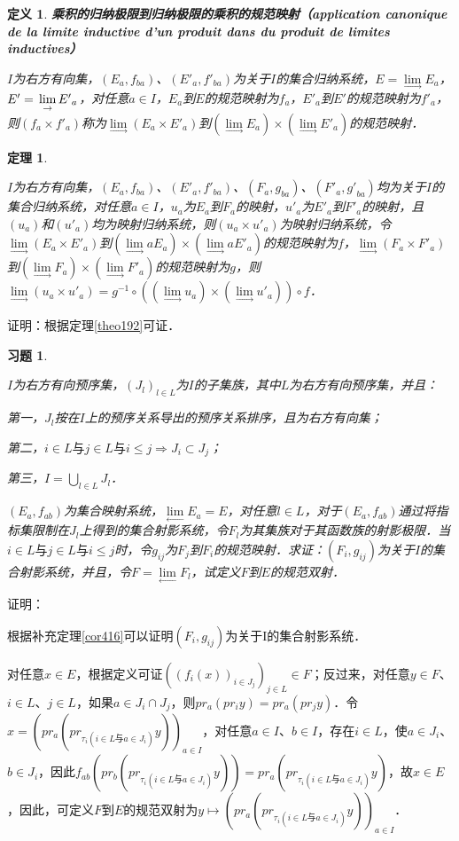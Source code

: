 \documentclass[12pt, a4paper, oneside]{book}
\newtheorem{theo}{定理}
\newtheorem{de}{定义}
\newtheorem{exer}{习题}
\begin{document}
			\begin{de}
				\textbf{乘积的归纳极限到归纳极限的乘积的规范映射（application canonique de la limite inductive d'un produit dans du produit de limites inductives）}
				\par
				$I$为右方有向集，$(E_a, f_{ba})$、$({E'}_a, {f'}_{ba})$为关于$I$的集合归纳系统，$E=\lim\limits_\to E_a$，$E'=\\\lim\limits_\to {E'}_a$，对任意$a\in I$，$E_a$到$E$的规范映射为$f_a$，${E'}_a$到$E'$的规范映射为${f'}_a$，则$(f_a\times {f'}_a)$称为$\lim\limits_\to (E_a\times {E'}_a)$到$(\lim\limits_\to E_a)\times (\lim\limits_\to{E'}_a)$的规范映射．
			\end{de}
					
			\begin{theo}\label{theo193}
				\hfill\par
				$I$为右方有向集，$(E_a, f_{ba})$、$({E'}_a, {f'}_{ba})$、$(F_a, g_{ba})$、$({F'}_a, {g'}_{ba})$均为关于$I$的集合归纳系统，对任意$a\in I$，$u_a$为$E_a$到$F_a$的映射，${u'}_a$为${E'}_a$到${F'}_a$的映射，且$(u_a)$和$({u'}_a)$均为映射归纳系统，则$(u_a\times {u'}_a)$为映射归纳系统，令$\lim\limits_\to (E_a\times {E'}_a)$到$(\lim\limits_\to aE_a)\times (\lim\limits_\to a{E'}_a)$的规范映射为$f$，$\lim\limits_\to (F_a\times {F'}_a)$到$(\lim\limits_\to F_a)\times (\lim\limits_\to {F'}_a)$的规范映射为$g$，则$\lim\limits_\to (u_a\times {u'}_a)= g^{-1}\circ ( (\lim\limits_\to u_a)\times (\lim\limits_\to {u'}_a))\circ f$．
			\end{theo}
			证明：根据定理\ref{theo192}可证．
			
			\begin{exer}\label{exer189}
				\hfill\par
				$I$为右方有向预序集，$(J_l)_{l\in L}$为$I$的子集族，其中$L$为右方有向预序集，并且：
				\par
				第一，$J_l$按在$I$上的预序关系导出的预序关系排序，且为右方有向集；
				\par
				第二，$i\in L\text{与}j\in L\text{与}i\leq j\Rightarrow J_i\subset J_j$；
				\par
				第三，$I=\bigcup\limits_{l\in L}J_l$．
				\par
				$(E_a, f_{ab})$为集合映射系统，$\lim\limits_\gets E_a=E$，对任意$l\in L$，对于$(E_a, f_{ab})$通过将指标集限制在$J_l$上得到的集合射影系统，令$F_l$为其集族对于其函数族的射影极限．当$i\in L\text{与}j\in L\text{与}i\leq j$时，令$g_{ij}$为$F_j$到$F_i$的规范映射．求证：$(F_i, g_{ij})$为关于$I$的集合射影系统，并且，令$F= \lim\limits_\gets F_l$，试定义$F$到$E$的规范双射．
			\end{exer}
			证明：
			\par
			根据补充定理\ref{cor416}可以证明$(F_i, g_{ij})$为关于I的集合射影系统．
			\par
			对任意$x\in E$，根据定义可证$((f_i(x))_{i\in J_j})_{j\in L}\in F$；反过来，对任意$y\in F$、$i\in L$、$j\in L$，如果$a\in J_i\cap J_j$，则$pr_a(pr_iy)=pr_a(pr_jy)$．令$x=(pr_a(pr_{\tau_i(i\in L\text{与}a\in J_i)}y))_{a\in I}$，对任意$a\in I$、$b\in I$，存在$i\in L$，使$a\in J_i$、$b\in J_i$，因此$f_{ab}(pr_b(pr_{\tau_i(i\in L\text{与}a\in J_i)}y))=pr_a(pr_{\tau_i(i\in L\text{与}a\in J_i)}y)$，故$x\in E$，因此，可定义$F$到$E$的规范双射为$y\mapsto (pr_a(pr_{\tau_i(i\in L\text{与}a\in J_i)}y))_{a\in I}$．
			
\end{document}
